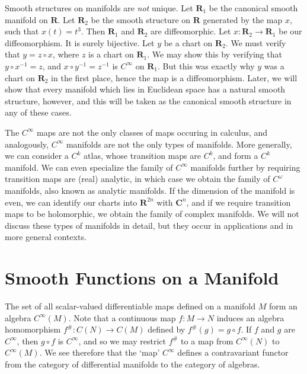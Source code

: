 \begin{example}
    Smooth structures on manifolds are {\it not} unique. Let $\mathbf{R}_1$ be the canonical smooth manifold on $\mathbf{R}$. Let $\mathbf{R}_2$ be the smooth structure on $\mathbf{R}$ generated by the map $x$, such that $x(t) = t^3$. Then $\mathbf{R}_1$ and $\mathbf{R}_2$ are diffeomorphic. Let $x:\mathbf{R}_2 \to \mathbf{R}_1$ be our diffeomorphism. It is surely bijective. Let $y$ be a chart on $\mathbf{R}_2$. We must verify that $y = z \circ x$, where $z$ is a chart on $\mathbf{R}_1$. We may show this by verifying that $y \circ x^{-1} = z$, and $x \circ y^{-1} = z^{-1}$ is $C^\infty$ on $\mathbf{R}_1$. But this was exactly why $y$ was a chart on $\mathbf{R}_2$ in the first place, hence the map is a diffeomorphism. Later, we will show that every manifold which lies in Euclidean space has a natural smooth structure, however, and this will be taken as the canonical smooth structure in any of these cases.
\end{example}

The $C^\infty$ maps are not the only classes of maps occuring in calculus, and analogously, $C^\infty$ manifolds are not the only types of manifolds. More generally, we can consider a $C^k$ atlas, whose transition maps are $C^k$, and form a $C^k$ manifold. We can even specialize the family of $C^\infty$ manifolds further by requiring transition maps are (real) analytic, in which case we obtain the family of $C^\omega$ manifolds, also known as analytic manifolds. If the dimension of the manifold is even, we can identify our charts into $\mathbf{R}^{2n}$ with $\mathbf{C}^n$, and if we require transition maps to be holomorphic, we obtain the family of complex manifolds. We will not discuss these types of manifolds in detail, but they occur in applications and in more general contexts.

\section{Smooth Functions on a Manifold}

The set of all scalar-valued differentiable maps defined on a manifold $M$ form an algebra $C^\infty(M)$. Note that a continuous map $f: M \to N$ induces an algebra homomorphism $f^\#: C(N) \to C(M)$ defined by $f^\#(g) = g \circ f$. If $f$ and $g$ are $C^\infty$, then $g \circ f$ is $C^\infty$, and so we may restrict $f^\#$ to a map from $C^\infty(N)$ to $C^\infty(M)$. We see therefore that the `map' $C^\infty$ defines a contravariant functor from the category of differential manifolds to the category of algebras.


